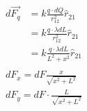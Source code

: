 \documentclass{article}
\begin{document}
\begin{eqnarray}
  d\vec{F_q} &= k\frac{q \cdot dQ}{r_{12}^2}\hat{r}_{21}\\
  &= k\frac{q \cdot \lambda dL}{r_{12}^2}\hat{r}_{21} \\
  &= k\frac{q\cdot \lambda dL}{L^2+x^2}\hat{r}_{21} \\
\end{eqnarray}
\begin{eqnarray}
  dF_x = dF\frac{x}{\sqrt{x^2+L^2}} \\
  dF_y = dF \cdot \frac{L}{\sqrt{x^2+L^2}}
\end{eqnarray}
\end{document}
